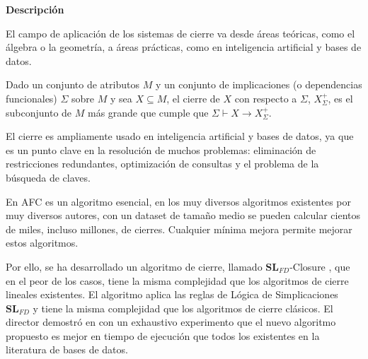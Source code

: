 \textbf{Descripci\'on} 



El campo de aplicaci\'on de los sistemas de cierre va desde \'areas te\'oricas, como el \'algebra o la geometr\'ia, a \'areas pr\'acticas, como en inteligencia artificial y bases de datos.

Dado un conjunto de atributos \( M \) y un conjunto de implicaciones (o dependencias funcionales) \( \Sigma \) sobre \( M \) y sea \( X \subseteq M \), el cierre de \( X \) con respecto a \( \Sigma \), \( X^+_{\Sigma} \), es el subconjunto de \( M \) m\'as grande que cumple que \( \Sigma \vdash X \to X^+_{\Sigma} \).

El cierre es ampliamente usado en inteligencia artificial y bases de datos, ya que es un punto clave en la resoluci\'on de muchos problemas: eliminaci\'on de restricciones redundantes, optimizaci\'on de consultas y el problema de la b\'usqueda de claves.

En AFC es un algoritmo esencial, en los muy diversos algoritmos existentes por muy diversos autores, con un dataset de tama\~no medio se pueden calcular cientos de miles, incluso millones, de cierres. Cualquier m\'inima mejora permite mejorar estos algoritmos. 

Por ello, se ha desarrollado un algoritmo de cierre, llamado \(\textbf{SL}_{FD}\)-Closure \cite{Mora2012a}, que en el peor de los casos, tiene la misma complejidad que los algoritmos de cierre lineales existentes.
El algoritmo aplica las reglas de L\'ogica de Simplicaciones \(\textbf{SL}_{FD}\) \cite{Cordero2002} y tiene la misma complejidad que los algoritmos de cierre cl\'asicos. El director demostr\'o en \cite{Mora2012a} con un exhaustivo experimento que el nuevo algoritmo propuesto es mejor en tiempo de ejecuci\'on que todos los existentes en la literatura de bases de datos. \\

